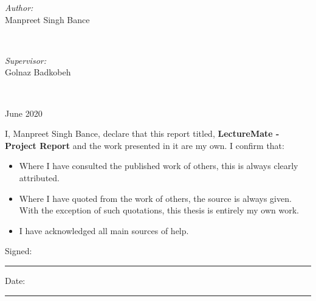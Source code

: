 \documentclass[oneside]{report}
\begin{document}
\begin{titlepage}
\begin{minipage}{0.4\textwidth}
\begin{flushleft} \large
\emph{Author:}\\
Manpreet Singh Bance %
\end{flushleft}
\end{minipage}
~
\begin{minipage}{0.4\textwidth}
\begin{flushright} \large
\emph{Supervisor:} \\
Golnaz Badkobeh \\[1.2em] %
\end{flushright}
\end{minipage}\\[2cm]
\makeatother



{\large June 2020}\\[2cm] %

\vfill %

\end{titlepage}


\begin{declaration}
\addchaptertocentry{\authorshipname} %
\noindent I, Manpreet Singh Bance, declare that this report titled, \textbf{LectureMate - Project Report} and the work presented in it are my own. I confirm that:

\begin{itemize} 
\item Where I have consulted the published work of others, this is always clearly attributed.
\item Where I have quoted from the work of others, the source is always given. With the exception of such quotations, this thesis is entirely my own work.
\item I have acknowledged all main sources of help.
\end{itemize}
 
\noindent Signed:\\
\rule[0.5em]{25em}{0.5pt} %
 
\noindent Date:\\
\rule[0.5em]{25em}{0.5pt} %
\end{declaration}
\end{document}
